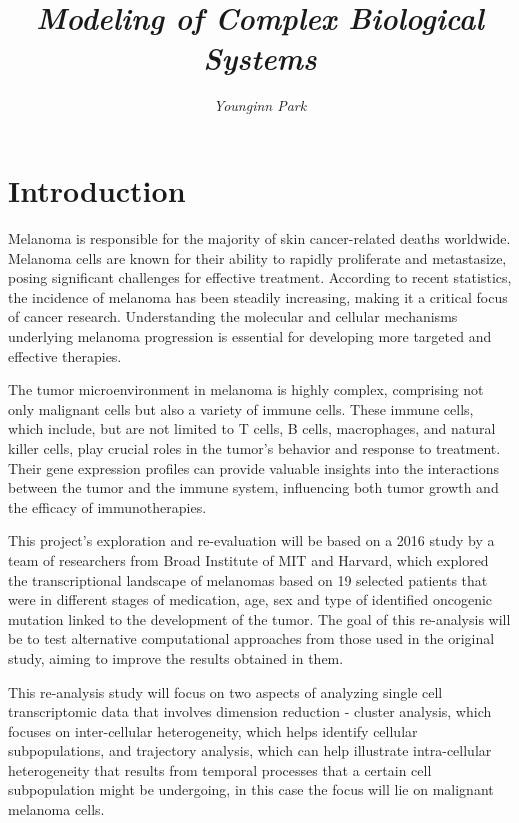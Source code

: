 \documentclass[11pt]{article}
\title{\vspace{-15mm}
    {\textbf{\centering {Exploration and re-analysis of a cellular subpopulation study using scRNA-seq data from melanoma samples}\\
			\vspace{5mm}
			\large \emph{Modeling of Complex Biological Systems}
   \vspace{-5mm}
}}}
\author{\textit{Younginn Park}}
\date{\begin{adjustwidth}{30pt}{30pt}
		\vspace{2mm}
		{\normalsize Melanoma is a highly malignant form of skin cancer that continues to pose significant challenges due to its complex cellular heterogeneity and metastatic potential. This project aims to re-examine the computational methods for single-cell transcriptomics applied to data from 19 melanoma patients in the 2016 study by Tirosh et al\cite{tirosh_dissecting_2016}. Findings from this project emphasize the importance of dimensionality reduction techniques for effective visualization and grouping of cells by their transcriptional profiles, while revealing some of the limitations of trajectory analysis. Inter-cellular heterogeneity, which was explored separately for malignant and non-malignant cells, was observed among cells in both subsets and improved upon the original study by applying feature selection steps. Malignant cells displayed heterogeneity by clustering around each of the distinct patient's tumor samples, which suggests uniqueness of each cancer's transcriptional profiles. On the other hand, non-malignant cells clustered around cell types demonstrating distinctness of transcriptomes of those cell types with some exceptions. However, the analysis of intra-cellular heterogeneity in selected malignant cells was less straightforward, falling short of revealing clear subpopulations, complicating the immediate application of trajectory inference.
  }
        \vspace{2mm}
\end{adjustwidth}}
\begin{document}
\maketitle

\thispagestyle{fancy}

\vspace{-10mm}

\section{Introduction}
\vspace{-4mm}
\begin{multicols}{2}
    \noindent
    Melanoma is responsible for the majority of skin cancer-related deaths worldwide\cite{heistein_malignant_2024}. Melanoma cells are known for their ability to rapidly proliferate and metastasize, posing significant challenges for effective treatment. According to recent statistics, the incidence of melanoma has been steadily increasing, making it a critical focus of cancer research\cite{noauthor_melanoma_2015}. Understanding the molecular and cellular mechanisms underlying melanoma progression is essential for developing more targeted and effective therapies.

    The tumor microenvironment in melanoma is highly complex, comprising not only malignant cells but also a variety of immune cells. These immune cells, which include, but are not limited to T cells, B cells, macrophages, and natural killer cells, play crucial roles in the tumor's behavior and response to treatment\cite{tirosh_dissecting_2016}. Their gene expression profiles can provide valuable insights into the interactions between the tumor and the immune system, influencing both tumor growth and the efficacy of immunotherapies.

    This project's exploration and re-evaluation will be based on a 2016 study by a team of researchers from Broad Institute of MIT and Harvard\cite{tirosh_dissecting_2016}, which explored the transcriptional landscape of melanomas based on 19 selected patients that were in different stages of medication, age, sex and type of identified oncogenic mutation linked to the development of the tumor. The goal of this re-analysis will be to test alternative computational approaches from those used in the original study, aiming to improve the results obtained in them. 
    
    This re-analysis study will focus on two aspects of analyzing single cell transcriptomic data that involves dimension reduction - cluster analysis, which focuses on inter-cellular heterogeneity, which helps identify cellular subpopulations, and trajectory analysis, which can help illustrate intra-cellular heterogeneity that results from temporal processes that a certain cell subpopulation might be undergoing, in this case the focus will lie on malignant melanoma cells.

\end{multicols}
    
\end{document}
